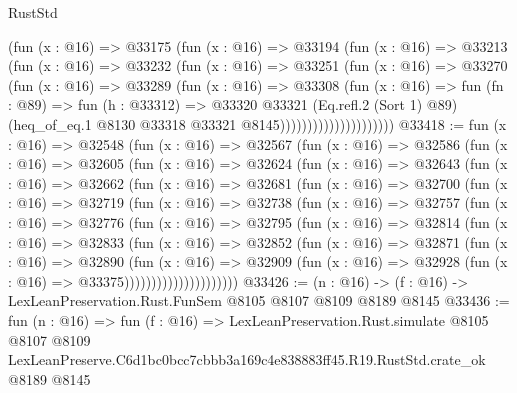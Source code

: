 \begin{lexlean}{RustStd}
\begin{coremodule}
                          (fun (x : @16) =>
                          @33175
                            (fun (x : @16) =>
                            @33194
                              (fun (x : @16) =>
                              @33213
                                (fun (x : @16) =>
                                @33232
                                  (fun (x : @16) =>
                                  @33251
                                    (fun (x : @16) =>
                                    @33270
                                      (fun (x : @16) =>
                                      @33289
                                        (fun (x : @16) =>
                                        @33308
                                          (fun (x : @16) =>
                                          fun (fn : @89) =>
                                          fun (h : @33312) =>
                                          @33320
                                            @33321
                                            (Eq.refl.{2} (Sort 1) @89)
                                            (heq_of_eq.{1}
                                              @8130
                                              @33318
                                              @33321
                                              @8145)))))))))))))))))))))
@33418 := fun (x : @16) =>
  @32548
    (fun (x : @16) =>
    @32567
      (fun (x : @16) =>
      @32586
        (fun (x : @16) =>
        @32605
          (fun (x : @16) =>
          @32624
            (fun (x : @16) =>
            @32643
              (fun (x : @16) =>
              @32662
                (fun (x : @16) =>
                @32681
                  (fun (x : @16) =>
                  @32700
                    (fun (x : @16) =>
                    @32719
                      (fun (x : @16) =>
                      @32738
                        (fun (x : @16) =>
                        @32757
                          (fun (x : @16) =>
                          @32776
                            (fun (x : @16) =>
                            @32795
                              (fun (x : @16) =>
                              @32814
                                (fun (x : @16) =>
                                @32833
                                  (fun (x : @16) =>
                                  @32852
                                    (fun (x : @16) =>
                                    @32871
                                      (fun (x : @16) =>
                                      @32890
                                        (fun (x : @16) =>
                                        @32909
                                          (fun (x : @16) =>
                                          @32928 (fun (x : @16) => @33375)))))))))))))))))))))
@33426 := (n : @16) -> (f : @16) -> LexLeanPreservation.Rust.FunSem @8105 @8107 @8109 @8189 @8145
@33436 := fun (n : @16) =>
  fun (f : @16) =>
  LexLeanPreservation.Rust.simulate
    @8105
    @8107
    @8109
    LexLeanPreserve.C6d1bc0bcc7cbbb3a169c4e838883ff45.R19.RustStd.crate_ok
    @8189
    @8145
\end{coremodule}
\end{lexlean}
